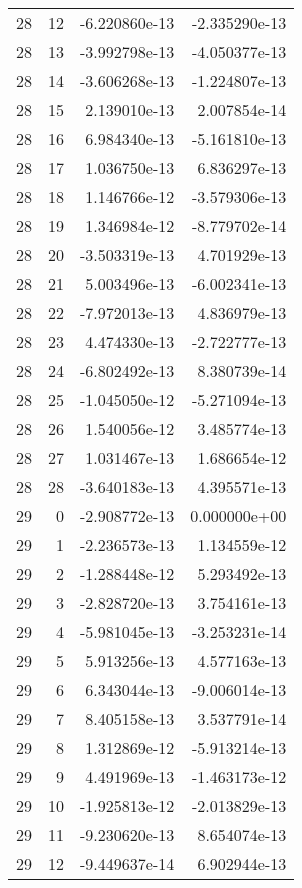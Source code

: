 \begin{tabular}{rrrr}
  28 &   12 & -6.220860e-13 & -2.335290e-13 \\
  28 &   13 & -3.992798e-13 & -4.050377e-13 \\
  28 &   14 & -3.606268e-13 & -1.224807e-13 \\
  28 &   15 &  2.139010e-13 &  2.007854e-14 \\
  28 &   16 &  6.984340e-13 & -5.161810e-13 \\
  28 &   17 &  1.036750e-13 &  6.836297e-13 \\
  28 &   18 &  1.146766e-12 & -3.579306e-13 \\
  28 &   19 &  1.346984e-12 & -8.779702e-14 \\
  28 &   20 & -3.503319e-13 &  4.701929e-13 \\
  28 &   21 &  5.003496e-13 & -6.002341e-13 \\
  28 &   22 & -7.972013e-13 &  4.836979e-13 \\
  28 &   23 &  4.474330e-13 & -2.722777e-13 \\
  28 &   24 & -6.802492e-13 &  8.380739e-14 \\
  28 &   25 & -1.045050e-12 & -5.271094e-13 \\
  28 &   26 &  1.540056e-12 &  3.485774e-13 \\
  28 &   27 &  1.031467e-13 &  1.686654e-12 \\
  28 &   28 & -3.640183e-13 &  4.395571e-13 \\
  29 &    0 & -2.908772e-13 &  0.000000e+00 \\
  29 &    1 & -2.236573e-13 &  1.134559e-12 \\
  29 &    2 & -1.288448e-12 &  5.293492e-13 \\
  29 &    3 & -2.828720e-13 &  3.754161e-13 \\
  29 &    4 & -5.981045e-13 & -3.253231e-14 \\
  29 &    5 &  5.913256e-13 &  4.577163e-13 \\
  29 &    6 &  6.343044e-13 & -9.006014e-13 \\
  29 &    7 &  8.405158e-13 &  3.537791e-14 \\
  29 &    8 &  1.312869e-12 & -5.913214e-13 \\
  29 &    9 &  4.491969e-13 & -1.463173e-12 \\
  29 &   10 & -1.925813e-12 & -2.013829e-13 \\
  29 &   11 & -9.230620e-13 &  8.654074e-13 \\
  29 &   12 & -9.449637e-14 &  6.902944e-13 \\

\end{tabular}
